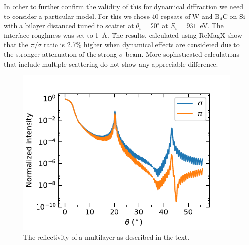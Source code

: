\documentclass[aps,onecolumn, notitlepage, longbibliography]{revtex4-1}
\begin{document}

In other to further confirm the validity of this for dynamical diffraction we need to consider a particular model. For this we chose 40 repeats of W and B$_4$C on Si with a bilayer distanced tuned to scatter at $\theta_i=20^{\circ}$ at $E_i=931$~eV. The interface roughness was set to 1~\AA{}. The results, calculated using ReMagX \cite{Macke2014} show that the $\pi/\sigma$ ratio is 2.7\% higher when dynamical effects are considered due to the stronger attenuation of the strong $\sigma$ beam.  More sophisticated calculations that include multiple scattering do not show any appreciable difference. 

\begin{figure}
    \includegraphics{Figs/ReMagX.pdf}
    \caption{The reflectivity of a multilayer as described in the text.}
    \label{Cu_RIXS_spectra}
\end{figure}


\end{document}
